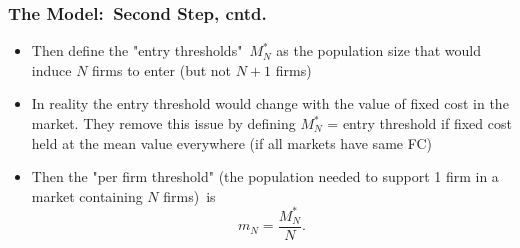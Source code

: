 \documentclass[notes=show]{beamer}
\begin{document}
\begin{frame}%

\frametitle{The Model:\ Second Step, cntd.}

\begin{itemize}
\item Then define the "entry thresholds"\ $M_{N}^{\ast }$ as the population
size that would induce $N$ firms to enter (but not $N+1$ firms)

\item In reality the entry threshold would change with the value of fixed
cost in the market. They remove this issue by defining $M_{N}^{\ast }$ =
entry threshold if fixed cost held at the mean value everywhere (if all
markets have same FC)

\item Then the "per firm threshold" (the population needed to support 1 firm
in a market containing $N$ firms)\ is%
\begin{equation*}
m_{N}=\frac{M_{N}^{\ast }}{N}.
\end{equation*}
\end{itemize}

\end{frame}%
\end{document}
